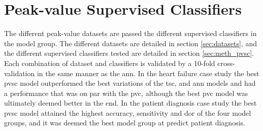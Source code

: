 \section{Peak-value Supervised Classifiers} \label{sec:disc_pvsc}
The different peak-value datasets are passed the different supervised classifiers in the model group. The different datasets are detailed in section \ref{sec:datasets}, and the different supervised classifiers tested are detailed in section \ref{sec:meth_pvsc}. Each combination of dataset and classifiers is validated by a 10-fold cross-validation in the same manner as the \acrshort{ann}. 
In the heart failure case study the best \acrshort{pvsc} model outperformed the best variations of the \acrshort{tsc}, and \acrshort{ann} models and had a performance that was on par with the \acrshort{pvc}, although the best \acrshort{pvc} model was ultimately deemed better in the end. In the patient diagnosis case study the best \acrshort{pvsc} model attained the highest accuracy, sensitivity and \acrshort{dor} of the four model groups, and it was deemed the best model group at predict patient diagnosis. \bigskip
